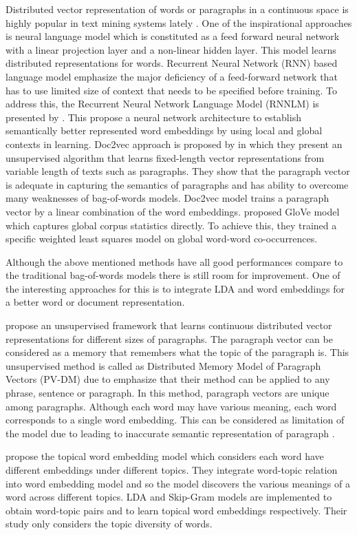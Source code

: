 \documentclass[a4paper,fleqn]{cas-dc}
\begin{document}
Distributed vector representation of words or paragraphs in a continuous space is highly popular in text mining systems lately \citep{ref8}. One of the inspirational approaches is \citep{ref9} neural language model which is constituted as a feed forward neural network with a linear projection layer and a non-linear hidden layer. This model learns distributed representations for words. Recurrent Neural Network (RNN) based language model  \citep{ref10} emphasize the major deficiency of a feed-forward network that has to use limited size of context that needs to be specified before training. To address this, the Recurrent Neural Network Language Model (RNNLM) is presented by \cite{ref10}. This propose a neural network architecture to establish semantically better represented word embeddings by using local and global contexts in learning. Doc2vec approach is proposed by \cite{ref3} in which they present an unsupervised algorithm that learns fixed-length vector representations from variable length of texts such as paragraphs. They show that the paragraph vector is adequate in capturing the semantics of paragraphs and has ability to overcome many weaknesses of bag-of-words models. Doc2vec model trains a paragraph vector by a linear combination of the word embeddings. \citep{ref11} proposed GloVe model which captures global corpus statistics directly. To achieve this, they trained a specific weighted least squares model on global word-word co-occurrences.

Although the above mentioned methods have all good performances compare to the traditional bag-of-words models there is still room for improvement. One of the interesting approaches for this is to integrate LDA and word embeddings for a better word or document representation. 

\cite{ref3} propose an unsupervised framework that learns continuous distributed vector representations for different sizes of paragraphs. The paragraph vector can be considered as a memory that remembers what the topic of the paragraph is. This unsupervised method is called as Distributed Memory Model of Paragraph Vectors (PV-DM) due to emphasize that their method can be applied to any phrase, sentence or paragraph. In this method, paragraph vectors are unique among paragraphs. Although each word may have various meaning, each word corresponds to a single word embedding. This can be considered as limitation of the model due to leading to inaccurate semantic representation of paragraph \citep{ref12}. 

\cite{ref6} propose the topical word embedding model which considers each word have different embeddings under different topics. They integrate word-topic relation into word embedding model and so the model discovers the various meanings of a word across different topics. LDA and Skip-Gram \cite{ref2} models are implemented to obtain word-topic pairs and to learn topical word embeddings respectively. Their study only considers the topic diversity of words.
\end{document}

